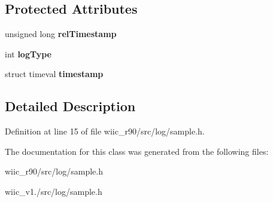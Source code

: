 \subsection*{Protected Attributes}
\begin{DoxyCompactItemize}
\item 
\hypertarget{class_sample_a24ea733ab0a815949a57aca2a4740e33}{unsigned long {\bfseries rel\-Timestamp}}\label{class_sample_a24ea733ab0a815949a57aca2a4740e33}

\item 
\hypertarget{class_sample_a3a6454628c790459f41de5c83bf3ec7c}{int {\bfseries log\-Type}}\label{class_sample_a3a6454628c790459f41de5c83bf3ec7c}

\item 
\hypertarget{class_sample_adbde42442423cd9dc8d971bf764391cc}{struct timeval {\bfseries timestamp}}\label{class_sample_adbde42442423cd9dc8d971bf764391cc}

\end{DoxyCompactItemize}


\subsection{Detailed Description}


Definition at line 15 of file wiic\-\_\-r90/src/log/sample.\-h.



The documentation for this class was generated from the following files\-:\begin{DoxyCompactItemize}
\item 
wiic\-\_\-r90/src/log/sample.\-h\item 
wiic\-\_\-v1./src/log/sample.\-h\end{DoxyCompactItemize}
